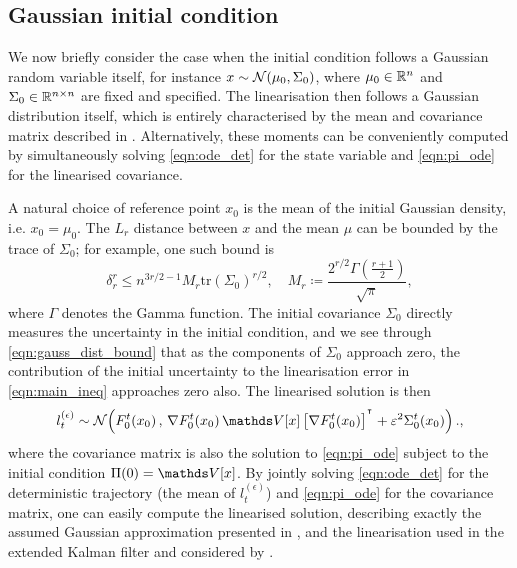 \subsection{Gaussian initial condition}
We now briefly consider the case when the initial condition follows a Gaussian random variable itself, for instance \(x \sim\mathcal{N}\!\left(\mu_0, \Sigma_0\right)\), where \(\mu_0 \in \mathbb{R}^n\) and \(\Sigma_0 \in \mathbb{R}^{n \times n}\) are fixed and specified.
The linearisation then follows a Gaussian distribution itself, which is entirely characterised by the mean and covariance matrix described in .
Alternatively, these moments can be conveniently computed by simultaneously solving \eqref{eqn:ode_det} for the state variable and \eqref{eqn:pi_ode} for the linearised covariance.

A natural choice of reference point \(x_0\) is the mean of the initial Gaussian density, i.e. \(x_0 = \mu_0\).
The \(L_r\) distance between \(x\) and the mean \(\mu\) can be bounded by the trace of \(\Sigma_0\); for example, one such bound is
\begin{equation}\label{eqn:gauss_dist_bound}
	\delta_r^{r} \leq n^{3r/2 - 1} M_r \mathrm{tr}\left(\Sigma_0\right)^{r/2}, \quad M_r \coloneqq \frac{2^{r/2}\Gamma\!\left(\frac{r + 1}{2}\right)}{\sqrt{\pi}},
\end{equation}
where \(\Gamma\) denotes the Gamma function.
The initial covariance \(\Sigma_0\) directly measures the uncertainty in the initial condition, and we see through \eqref{eqn:gauss_dist_bound} that as the components of \(\Sigma_0\) approach zero, the contribution of the initial uncertainty to the linearisation error in \eqref{eqn:main_ineq} approaches zero also.
The linearised solution is then
\[
	l_t^{(\epsilon)} \isGauss{F_0^t\!\left(x_0\right), \, \nabla F_0^t\!\left(x_0\right) \var{x}\left[\nabla F_0^t\!\left(x_0\right)\right]^{\T} + \varepsilon^2 \Sigma_0^t\!\left(x_0\right)}.,
\]
where the covariance matrix is also the solution to \eqref{eqn:pi_ode} subject to the initial condition \(\Pi(0) = \var{x}\).
By jointly solving \eqref{eqn:ode_det} for the deterministic trajectory (the mean of \(l_t^{(\epsilon)}\)) and \eqref{eqn:pi_ode} for the covariance matrix, one can easily compute the linearised solution, describing exactly the assumed Gaussian approximation presented in \citet{SarkkaSolin_2019_AppliedStochasticDifferential}, and the linearisation used in the extended Kalman filter \cite{Jazwinski_2014_StochasticProcessesFiltering} and considered by \citet{Sanz-AlonsoStuart_2017_GaussianApproximationsSmall}.


